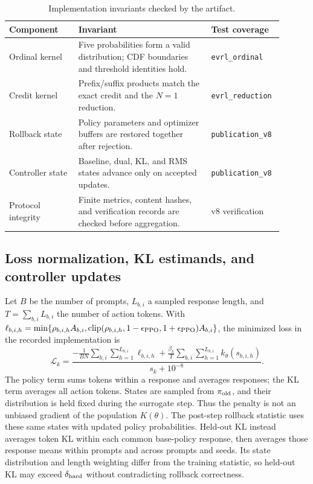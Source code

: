 \begin{table}[H]
\centering
\footnotesize
\caption{Implementation invariants checked by the artifact.}
\label{tab:implementation-audit}
\begin{tabular}{p{0.24\linewidth}p{0.46\linewidth}p{0.20\linewidth}}
\toprule
Component & Invariant & Test coverage \\
\midrule
Ordinal kernel & Five probabilities form a valid distribution; CDF boundaries and threshold identities hold. & \texttt{evrl\_ordinal} \\
Credit kernel & Prefix/suffix products match the exact credit and the \(N=1\) reduction. & \texttt{evrl\_reduction} \\
Rollback state & Policy parameters and optimizer buffers are restored together after rejection. & \texttt{publication\_v8} \\
Controller state & Baseline, dual, KL, and RMS states advance only on accepted updates. & \texttt{publication\_v8} \\
Protocol integrity & Finite metrics, content hashes, and verification records are checked before aggregation. & v8 verification \\
\bottomrule
\end{tabular}
\end{table}

\newpage
\subsection{Loss normalization, KL estimands, and controller updates}
Let \(B\) be the number of prompts, \(L_{b,i}\) a sampled response length,
and \(T=\sum_{b,i}L_{b,i}\) the number of action tokens. With
\(\ell_{b,i,h}=\min\{\rho_{b,i,h}A_{b,i},
\operatorname{clip}(\rho_{b,i,h},1-\epsilon_{\rm PPO},1+\epsilon_{\rm PPO})A_{b,i}\}\),
the minimized loss in the recorded implementation is
\[
\mathcal L_k=\frac{-\frac1{BN}\sum_{b,i}\sum_{h=1}^{L_{b,i}}\ell_{b,i,h}
+\frac{\beta_k}{T}\sum_{b,i}\sum_{h=1}^{L_{b,i}}k_\theta(s_{b,i,h})}
{s_k+10^{-8}}.
\]
The policy term sums tokens within a response and averages responses; the KL
term averages all action tokens. States are sampled from \(\pi_{\rm old}\),
and their distribution is held fixed during the surrogate step. Thus the
penalty is not an unbiased gradient of the population \(K(\theta)\).
The post-step rollback statistic uses these same states with updated policy
probabilities. Held-out KL instead averages token KL within each common
base-policy response, then averages those response means within prompts and
across prompts and seeds. Its state distribution and length weighting differ
from the training statistic, so held-out KL may exceed \(\delta_{\rm hard}\)
without contradicting rollback correctness.

